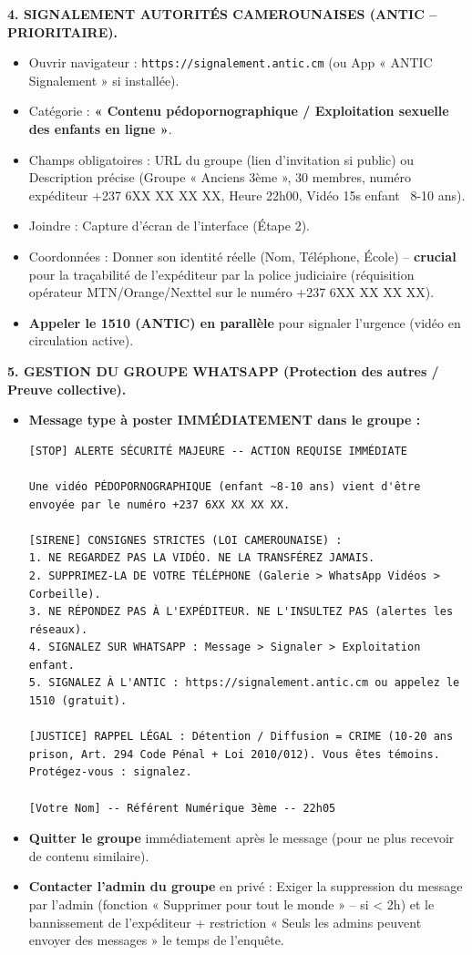 \documentclass[11pt]{article}
\begin{document}
\begin{exoresolu}
\textbf{4. SIGNALEMENT AUTORITÉS CAMEROUNAISES (ANTIC -- PRIORITAIRE).}
\begin{itemize}
    \item Ouvrir navigateur : \texttt{https://signalement.antic.cm} (ou App « ANTIC Signalement » si installée).
    \item Catégorie : \textbf{« Contenu pédopornographique / Exploitation sexuelle des enfants en ligne »}.
    \item Champs obligatoires : URL du groupe (lien d'invitation si public) ou Description précise (Groupe « Anciens 3ème », 30 membres, numéro expéditeur +237 6XX XX XX XX, Heure 22h00, Vidéo 15s enfant ~8-10 ans).
    \item Joindre : Capture d'écran de l'interface (Étape 2).
    \item Coordonnées : Donner son identité réelle (Nom, Téléphone, École) -- \textbf{crucial} pour la traçabilité de l'expéditeur par la police judiciaire (réquisition opérateur MTN/Orange/Nexttel sur le numéro +237 6XX XX XX XX).
    \item \textbf{Appeler le 1510 (ANTIC) en parallèle} pour signaler l'urgence (vidéo en circulation active).
\end{itemize}

\textbf{5. GESTION DU GROUPE WHATSAPP (Protection des autres / Preuve collective).}
\begin{itemize}
    \item \textbf{Message type à poster IMMÉDIATEMENT dans le groupe :}
\begin{lstlisting}[language=text]
[STOP] ALERTE SÉCURITÉ MAJEURE -- ACTION REQUISE IMMÉDIATE

Une vidéo PÉDOPORNOGRAPHIQUE (enfant ~8-10 ans) vient d'être envoyée par le numéro +237 6XX XX XX XX.

[SIRENE] CONSIGNES STRICTES (LOI CAMEROUNAISE) :
1. NE REGARDEZ PAS LA VIDÉO. NE LA TRANSFÉREZ JAMAIS.
2. SUPPRIMEZ-LA DE VOTRE TÉLÉPHONE (Galerie > WhatsApp Vidéos > Corbeille).
3. NE RÉPONDEZ PAS À L'EXPÉDITEUR. NE L'INSULTEZ PAS (alertes les réseaux).
4. SIGNALEZ SUR WHATSAPP : Message > Signaler > Exploitation enfant.
5. SIGNALEZ À L'ANTIC : https://signalement.antic.cm ou appelez le 1510 (gratuit).

[JUSTICE] RAPPEL LÉGAL : Détention / Diffusion = CRIME (10-20 ans prison, Art. 294 Code Pénal + Loi 2010/012). Vous êtes témoins. Protégez-vous : signalez.

[Votre Nom] -- Référent Numérique 3ème -- 22h05
\end{lstlisting}
    \item \textbf{Quitter le groupe} immédiatement après le message (pour ne plus recevoir de contenu similaire).
    \item \textbf{Contacter l'admin du groupe} en privé : Exiger la suppression du message par l'admin (fonction « Supprimer pour tout le monde » -- si < 2h) et le bannissement de l'expéditeur + restriction « Seuls les admins peuvent envoyer des messages » le temps de l'enquête.
\end{itemize}


\end{exoresolu}
\end{document}
